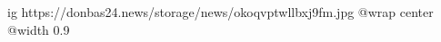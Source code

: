  
 
 
 
 

\ifcmt
  ig https://donbas24.news/storage/news/okoqvptwllbxj9fm.jpg
  @wrap center
  @width 0.9
\fi
